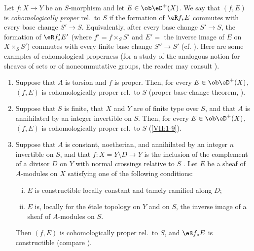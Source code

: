 \documentclass[oneside]{book}
\begin{document}
Let $f:X\to Y$ be an $S$-morphism and let $E\in\ob\eD^+(X)$. We say that
$(f,E)$ is \emph{cohomologically proper} rel.\ to $S$ if the formation of
$\eR f_\ast E$ commutes with every base change $S'\to S$. Equivalently, after
every base change $S'\to S$, the formation of $\eR f_\ast' E'$ (where
$f'=f\times_S S'$ and $E'=$ the inverse image of $E$ on $X\times_S S'$)
commutes with every finite base change $S'' \to S'$ (cf.
\cite[XII 6.1]{sga4}). Here are some examples of cohomological properness
(for a study of the analogous notion for sheaves of sets or of
noncommutative groups, the reader may consult \cite[XIII]{sga1}).
\begin{enumerate} %
  \item Suppose that $A$ is torsion and $f$ is proper. Then, for every
    $E\in\ob\eD^+(X)$, $(f,E)$ is cohomologically proper rel.\ to $S$
    (proper base-change theorem, \cite[XII 5.1]{sga4}).
  \item Suppose that $S$ is finite, that $X$ and $Y$ are of finite type over
    $S$, and that $A$ is annihilated by an integer invertible on $S$. Then,
    for every $E\in\ob\eD^+(X)$, $(f,E)$ is cohomologically proper rel.\ to
    $S$ (\ref{VII:1-9}).
  \item Suppose that $A$ is constant, noetherian, and annihilated by an
    integer $n$ invertible on $S$, and that
    $f:X=Y\setminus D\to Y$ is the inclusion of the complement of a divisor
    $D$ on $Y$ with normal crossings relative to $S$
    \cite[XIII 2.1]{sga1}. Let $E$ be a sheaf of $A$-modules on $X$ satisfying
    one of the following conditions:
    \begin{enumerate}[(i)]
      \item $E$ is constructible locally constant and tamely ramified along
        $D$;
      \item $E$ is, locally for the étale topology on $Y$ and on $S$, the
        inverse image of a sheaf of $A$-modules on $S$.
    \end{enumerate}
    Then $(f,E)$ is cohomologically proper rel.\ to $S$, and $\eR f_\ast E$
    is constructible (compare \cite[XIII 2.4]{sga1}).
\end{enumerate} 
\end{document}
